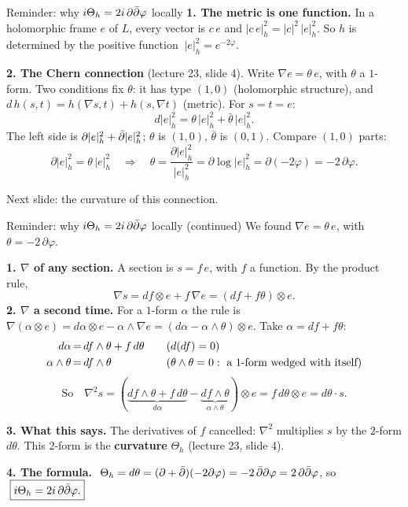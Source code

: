\begin{frame}{Reminder: why \(i\Theta_h=2i\,\partial\bar\partial\varphi\) locally}
\label{fr:curvature-reminder}
\textbf{1. The metric is one function.} In a holomorphic frame \(e\) of \(L\), every vector is \(c\,e\) and \(|c\,e|_h^2=|c|^2\,|e|_h^2\). So \(h\) is determined by the positive function \(\ |e|_h^2=e^{-2\varphi}\).
\par\smallskip
\textbf{2. The Chern connection} (lecture 23, slide 4). Write \(\nabla e=\theta\,e\), with \(\theta\) a \(1\)-form. Two conditions fix \(\theta\): it has type \((1,0)\) (holomorphic structure), and \(d\,h(s,t)=h(\nabla s,t)+h(s,\nabla t)\) (metric). For \(s=t=e\):
\[
d|e|_h^2=\theta\,|e|_h^2+\bar\theta\,|e|_h^2 .
\]
The left side is \(\partial|e|_h^2+\bar\partial|e|_h^2\); \(\theta\) is \((1,0)\), \(\bar\theta\) is \((0,1)\). Compare \((1,0)\) parts:
\[
\partial|e|_h^2=\theta\,|e|_h^2\quad\Longrightarrow\quad\theta=\frac{\partial|e|_h^2}{|e|_h^2}=\partial\log|e|_h^2=\partial(-2\varphi)=-2\,\partial\varphi .
\]
\par\medskip
Next slide: the curvature of this connection.
\end{frame}

\begin{frame}{Reminder: why \(i\Theta_h=2i\,\partial\bar\partial\varphi\) locally (continued)}
\label{fr:curvature-twice}
We found \(\nabla e=\theta\,e\), with \(\theta=-2\,\partial\varphi\).
\par
\textbf{1. \(\nabla\) of any section.} A section is \(s=f\,e\), with \(f\) a function. By the product rule,
\[
\nabla s=df\otimes e+f\,\nabla e=(df+f\theta)\otimes e .
\]
\textbf{2. \(\nabla\) a second time.} For a \(1\)-form \(\alpha\) the rule is \(\nabla(\alpha\otimes e)=d\alpha\otimes e-\alpha\wedge\nabla e=(d\alpha-\alpha\wedge\theta)\otimes e\). Take \(\alpha=df+f\theta\):
\[
\begin{array}{r@{\,=\,}l@{\qquad}l}
d\alpha & df\wedge\theta+f\,d\theta & (d(df)=0)\\[3pt]
\alpha\wedge\theta & df\wedge\theta & (\theta\wedge\theta=0:\ \text{a } 1\text{-form wedged with itself})
\end{array}
\]
\[
\text{So}\quad\nabla^2s=(\underbrace{df\wedge\theta+f\,d\theta}_{d\alpha}-\underbrace{df\wedge\theta}_{\alpha\wedge\theta})\otimes e=f\,d\theta\otimes e=\boxed{d\theta\cdot s.}
\]
\par\smallskip
\textbf{3. What this says.} The derivatives of \(f\) cancelled: \(\nabla^2\) multiplies \(s\) by the \(2\)-form \(d\theta\). This \(2\)-form is the \textbf{curvature} \(\Theta_h\) (lecture 23, slide 4).
\par\smallskip
\textbf{4. The formula.} \(\ \Theta_h=d\theta=(\partial+\db)(-2\partial\varphi)=-2\,\db\partial\varphi=2\,\partial\db\varphi\), so
\(\ \boxed{i\Theta_h=2i\,\partial\bar\partial\varphi .}\)
\end{frame}



